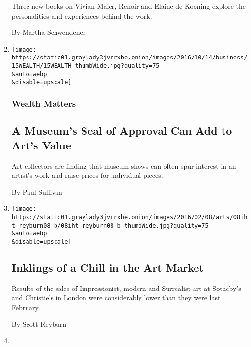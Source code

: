 \begin{enumerate}
  Three new books on Vivian Maier, Renoir and Elaine de Kooning explore
  the personalities and experiences behind the work.

  By Martha Schwendener
\item
  \href{/2016/10/15/your-money/a-museums-seal-of-approval-can-add-to-arts-value.html}{}

  \texttt{[image: https://static01.graylady3jvrrxbe.onion/images/2016/10/14/business/15WEALTH/15WEALTH-thumbWide.jpg?quality=75\\\&auto=webp\\\&disable=upscale]}

  \hypertarget{wealth-matters}{%
  \subsubsection{Wealth Matters}\label{wealth-matters}}

  \hypertarget{a-museums-seal-of-approval-can-add-to-arts-value}{%
  \subsection{A Museum's Seal of Approval Can Add to Art's
  Value}\label{a-museums-seal-of-approval-can-add-to-arts-value}}

  Art collectors are finding that museum shows can often spur interest
  in an artist's work and raise prices for individual pieces.

  By Paul Sullivan
\item
  \href{/2016/02/08/arts/international/inklings-of-a-chill-in-the-art-market.html}{}

  \texttt{[image: https://static01.graylady3jvrrxbe.onion/images/2016/02/08/arts/08iht-reyburn08-b/08iht-reyburn08-b-thumbWide.jpg?quality=75\\\&auto=webp\\\&disable=upscale]}

  \hypertarget{inklings-of-a-chill-in-the-art-market}{%
  \subsection{Inklings of a Chill in the Art
  Market}\label{inklings-of-a-chill-in-the-art-market}}

  Results of the sales of Impressionist, modern and Surrealist art at
  Sotheby's and Christie's in London were considerably lower than they
  were last February.

  By Scott Reyburn
\item
  \href{https://artsbeat.blogs.nytimes3xbfgragh.onion/2016/01/22/whats-on-this-week-around-the-world-60/}{}


\end{enumerate}
